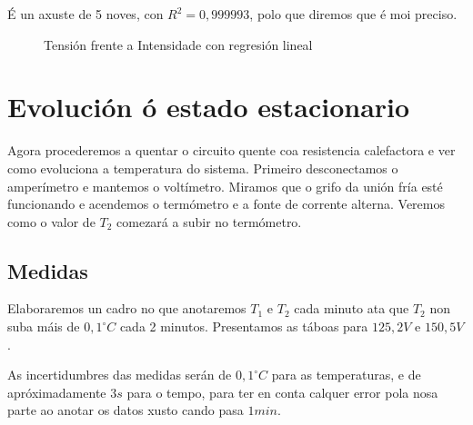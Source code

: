 \documentclass[12pt, a4paper, titlepage]{article}
\begin{document}
  É un axuste de 5 noves, con $R^2 = 0,999993$, polo que diremos que é moi preciso.

  \begin{figure}[H]
    \hspace{12pt}
    
    \caption{Tensión frente a Intensidade con regresión lineal}
  \end{figure}




  \section{Evolución ó estado estacionario}

  Agora procederemos a quentar o circuito quente coa resistencia calefactora e ver como evoluciona a temperatura do sistema.
  Primeiro desconectamos o amperímetro e mantemos o voltímetro. Miramos que o grifo da unión fría esté funcionando e acendemos o termómetro e a fonte de corrente alterna.
  Veremos como o valor de $T_2$ comezará a subir no termómetro.

  \subsection{Medidas}

  Elaboraremos un cadro no que anotaremos $T_1$ e $T_2$ cada minuto ata que $T_2$ non suba máis de $0,1 ^{\circ} C$ cada 2 minutos.
  Presentamos as táboas para $125,2V$ e $150,5V$.

  As incertidumbres das medidas serán de $0,1 ^{\circ} C$ para as temperaturas, e de apróximadamente $3 s$ para o tempo, para ter en conta calquer error pola nosa parte ao anotar os datos xusto cando pasa $1 min$.
\end{document}

